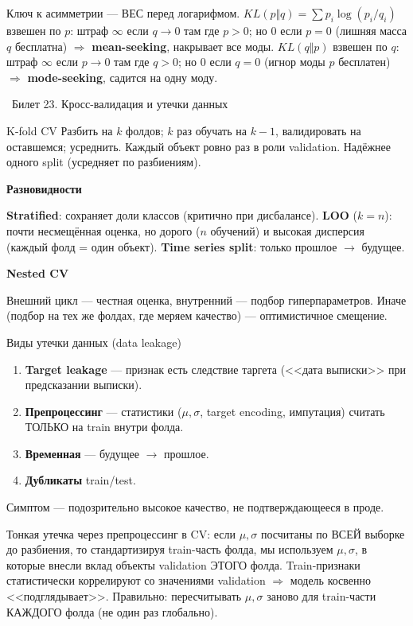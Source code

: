 \documentclass[12pt, a4paper]{article}
\newcommand{\bilet}[2]{%
  \vspace{10pt}%
  \noindent\colorbox{qcolor}{\parbox{\dimexpr\linewidth-2\fboxsep\relax}{%
    \color{white}\large\bfseries\strut\ Билет #1. #2%
  }}%
  \nopagebreak\vspace{5pt}\par\nopagebreak%
}
\newcommand{\qsub}[1]{%
  \vspace{5pt}%
  {\bfseries\color{defblue} #1}%
  \par\vspace{2pt}%
}
\begin{document}
\begin{fishkabox}
Ключ к асимметрии --- ВЕС перед логарифмом. $KL(p\Vert q) = \sum p_i\log(p_i/q_i)$ взвешен по $p$: штраф $\infty$ если $q \to 0$ там где $p > 0$; но $0$ если $p = 0$ (лишняя масса $q$ бесплатна) $\Rightarrow$ \textbf{mean-seeking}, накрывает все моды. $KL(q\Vert p)$ взвешен по $q$: штраф $\infty$ если $p \to 0$ там где $q > 0$; но $0$ если $q = 0$ (игнор моды $p$ бесплатен) $\Rightarrow$ \textbf{mode-seeking}, садится на одну моду.
\end{fishkabox}

\bilet{23}{Кросс-валидация и утечки данных}

\begin{defbox}{K-fold CV}
Разбить на $k$ фолдов; $k$ раз обучать на $k{-}1$, валидировать на оставшемся; усреднить. Каждый объект ровно раз в роли validation. Надёжнее одного split (усредняет по разбиениям).
\end{defbox}

\qsub{Разновидности}
\textbf{Stratified}: сохраняет доли классов (критично при дисбалансе). \textbf{LOO} ($k = n$): почти несмещённая оценка, но дорого ($n$ обучений) и высокая дисперсия (каждый фолд = один объект). \textbf{Time series split}: только прошлое $\to$ будущее.

\qsub{Nested CV}
Внешний цикл --- честная оценка, внутренний --- подбор гиперпараметров. Иначе (подбор на тех же фолдах, где меряем качество) --- оптимистичное смещение.

\begin{defbox}{Виды утечки данных (data leakage)}
\begin{enumerate}
  \item \textbf{Target leakage} --- признак есть следствие таргета (<<дата выписки>> при предсказании выписки).
  \item \textbf{Препроцессинг} --- статистики ($\mu,\sigma$, target encoding, импутация) считать ТОЛЬКО на train внутри фолда.
  \item \textbf{Временная} --- будущее $\to$ прошлое.
  \item \textbf{Дубликаты} train/test.
\end{enumerate}
Симптом --- подозрительно высокое качество, не подтверждающееся в проде.
\end{defbox}

\begin{fishkabox}
Тонкая утечка через препроцессинг в CV: если $\mu,\sigma$ посчитаны по ВСЕЙ выборке до разбиения, то стандартизируя train-часть фолда, мы используем $\mu,\sigma$, в которые внесли вклад объекты validation ЭТОГО фолда. Train-признаки статистически коррелируют со значениями validation $\Rightarrow$ модель косвенно <<подглядывает>>. Правильно: пересчитывать $\mu,\sigma$ заново для train-части КАЖДОГО фолда (не один раз глобально).
\end{fishkabox}
\end{document}
